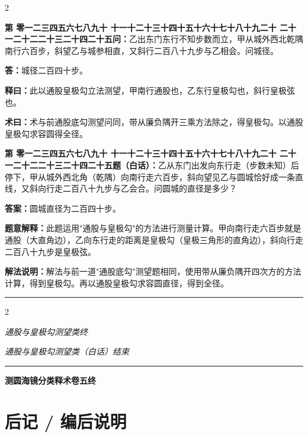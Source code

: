 \documentclass[10pt,a4paper]{article}
\newcommand{\longline}{\noindent\rule{\textwidth}{0.4pt}}
\newcounter{probnum}
\newcounter{probnumvol}[section]
\newcommand{\chnum}[1]{%
  \ifcase#1 零\or 一\or 二\or 三\or 四\or 五\or 六\or 七\or 八\or 九\or 十\or
    十一\or 十二\or 十三\or 十四\or 十五\or 十六\or 十七\or 十八\or 十九\or 二十\or
    二十一\or 二十二\or 二十三\or 二十四\or 二十五\fi}
\newcommand{\problemclassical}[1]{%
  \stepcounter{probnumvol}%
  \par\noindent
  \textcolor{classicalcolor}{\textbf{第\chnum{\value{probnumvol}}问：}}#1\par\smallskip
}
\newcommand{\problemmodern}[1]{%
  \par\noindent
  \textcolor{moderncolor}{\textbf{第\chnum{\value{probnumvol}}题（白话）：}}#1\par\smallskip
}
\newcommand{\answerclassical}[1]{%
  \par\noindent\textcolor{classicalcolor}{\textbf{答：}}#1\par
}
\newcommand{\answermodern}[1]{%
  \par\noindent\textcolor{moderncolor}{\textbf{答案：}}#1\par
}
\newcommand{\shiyiclassical}[1]{%
  \par\noindent\textcolor{classicalcolor}{\textbf{释曰：}}#1\par
}
\newcommand{\shiyimodern}[1]{%
  \par\noindent\textcolor{moderncolor}{\textbf{题意解释：}}#1\par
}
\newcommand{\shuyueclassical}[1]{%
  \par\noindent\textcolor{classicalcolor}{\textbf{术曰：}}#1\par
}
\newcommand{\shuyuemodern}[1]{%
  \par\noindent\textcolor{moderncolor}{\textbf{解法说明：}}#1\par
}
\newcommand{\endclassical}[1]{%
  \vspace{0.3cm}
  \begin{center}\textit{#1}\end{center}
}
\newcommand{\endmodern}[1]{%
  \vspace{0.3cm}
  \begin{center}\textit{#1}\end{center}
}
\begin{document}
\begin{paracol}{2}

\problemclassical{乙出东门东行不知步数而立，甲从城外西北乾隅南行六百步，斜望乙与城参相直，又斜行二百八十九步与乙相会。问城径。}

\answerclassical{城径二百四十步。}

\shiyiclassical{此以通股皇极勾立法测望，甲南行通股也，乙东行皇极勾也，斜行皇极弦也。}

\shuyueclassical{术与前通股底勾测望问同，带从廉负隅开三乘方法除之，得皇极勾。以通股皇极勾求容圆得全径。}

\switchcolumn

\problemmodern{乙从东门出发向东行走（步数未知）后停下，甲从城外西北角（乾隅）向南行走六百步，斜向望见乙与圆城恰好成一条直线，又斜向行走二百八十九步与乙会合。问圆城的直径是多少？}

\answermodern{圆城直径为二百四十步。}

\shiyimodern{此题运用"通股与皇极勾"的方法进行测量计算。甲向南行走六百步就是通股（大直角边），乙向东行走的距离是皇极勾（皇极三角形的直角边），斜向行走二百八十九步是皇极弦。}

\shuyuemodern{解法与前一道"通股底勾"测望题相同，使用带从廉负隅开四次方的方法计算，得到皇极勾。再以通股皇极勾求容圆直径，得到全径。}

\end{paracol}

\vspace{0.5cm}
\longline
\begin{paracol}{2}
\endclassical{通股与皇极勾测望类终}
\switchcolumn
\endmodern{通股与皇极勾测望类（白话）结束}
\end{paracol}

\vspace{0.5cm}
\longline
\begin{center}
{\Large\bfseries\color{volcolor} 测圆海镜分类释术卷五终}
\end{center}

\newpage


\section*{后记 / 编后说明}
\end{document}
